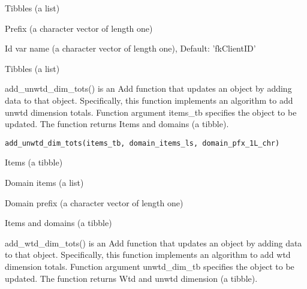 \documentclass[a4paper]{book}
\begin{document}
%
\begin{Arguments}
\begin{ldescription}
\item[\code{tbs\_ls}] Tibbles (a list)

\item[\code{prefix\_1L\_chr}] Prefix (a character vector of length one)

\item[\code{id\_var\_nm\_1L\_chr}] Id var name (a character vector of length one), Default: 'fkClientID'
\end{ldescription}
\end{Arguments}
%
\begin{Value}
Tibbles (a list)
\end{Value}
%
\begin{Description}\relax
add\_unwtd\_dim\_tots() is an Add function that updates an object by adding data to that object. Specifically, this function implements an algorithm to add unwtd dimension totals. Function argument items\_tb specifies the object to be updated. The function returns Items and domains (a tibble).
\end{Description}
%
\begin{Usage}
\begin{verbatim}
add_unwtd_dim_tots(items_tb, domain_items_ls, domain_pfx_1L_chr)
\end{verbatim}
\end{Usage}
%
\begin{Arguments}
\begin{ldescription}
\item[\code{items\_tb}] Items (a tibble)

\item[\code{domain\_items\_ls}] Domain items (a list)

\item[\code{domain\_pfx\_1L\_chr}] Domain prefix (a character vector of length one)
\end{ldescription}
\end{Arguments}
%
\begin{Value}
Items and domains (a tibble)
\end{Value}
%
\begin{Description}\relax
add\_wtd\_dim\_tots() is an Add function that updates an object by adding data to that object. Specifically, this function implements an algorithm to add wtd dimension totals. Function argument unwtd\_dim\_tb specifies the object to be updated. The function returns Wtd and unwtd dimension (a tibble).
\end{Description}
\end{document}
